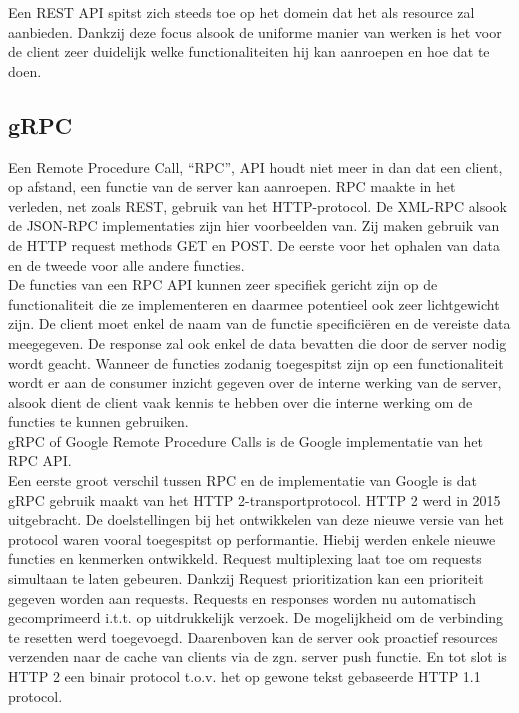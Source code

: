 Een REST API spitst zich steeds toe op het domein dat het als resource zal aanbieden.
Dankzij deze focus alsook de uniforme manier van werken is het voor de client zeer duidelijk welke functionaliteiten hij kan aanroepen en hoe dat te doen.
~\autocite{jscrambler}
~\autocite{hubspot}
~\autocite{HTTP1.1vsHTTP2}\\

\subsection{gRPC}

Een Remote Procedure Call, ``RPC'', API houdt niet meer in dan dat een client, op afstand, een functie van de server kan aanroepen.
RPC maakte in het verleden, net zoals REST, gebruik van het HTTP-protocol. De XML-RPC alsook de JSON-RPC implementaties zijn hier voorbeelden van.
Zij maken gebruik van de HTTP request methods GET en POST. De eerste voor het ophalen van data en de tweede voor alle andere functies.\\

De functies van een RPC API kunnen zeer specifiek gericht zijn op de functionaliteit die ze implementeren en daarmee potentieel ook zeer lichtgewicht zijn.
De client moet enkel de naam van de functie specificiëren en de vereiste data meegegeven. De response zal ook enkel de data bevatten die door de server nodig wordt geacht.
Wanneer de functies zodanig toegespitst zijn op een functionaliteit wordt er aan de consumer inzicht gegeven over de interne werking van de server,
alsook dient de client vaak kennis te hebben over die interne werking om de functies te kunnen gebruiken.
~\autocite{altexsoft}\\

gRPC of Google Remote Procedure Calls is de Google implementatie van het RPC API.\\
Een eerste groot verschil tussen RPC en de implementatie van Google is dat gRPC gebruik maakt van het HTTP 2-transportprotocol.
HTTP 2 werd in 2015 uitgebracht. De doelstellingen bij het ontwikkelen van deze nieuwe versie van het protocol waren vooral toegespitst op performantie.
Hiebij werden enkele nieuwe functies en kenmerken ontwikkeld. Request multiplexing laat toe om requests simultaan te laten gebeuren.
Dankzij Request prioritization kan een prioriteit gegeven worden aan requests. Requests en responses worden nu automatisch gecomprimeerd i.t.t. op
uitdrukkelijk verzoek. De mogelijkheid om de verbinding te resetten werd toegevoegd. Daarenboven kan de server ook proactief resources verzenden naar de
cache van clients via de zgn. server push functie. En tot slot is HTTP 2 een binair protocol t.o.v. het op gewone tekst gebaseerde HTTP 1.1 protocol.
~\autocite{baeldung}\\

